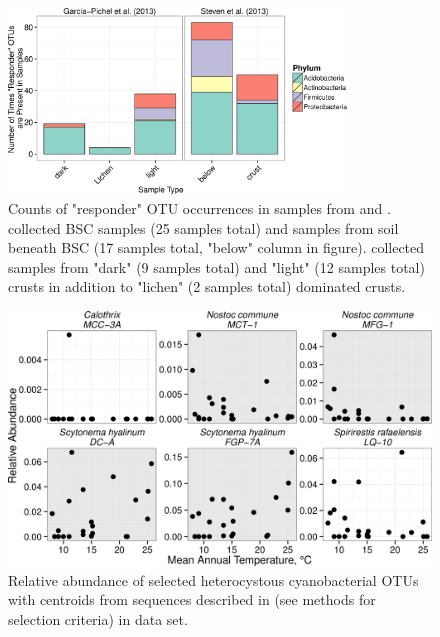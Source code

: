 \begin{figure}[h!]
  \centering
    \includegraphics[width=0.8\textwidth]{figures/rspndr_dist/rspndr_dist.png}
  \caption{Counts of "responder" OTU occurrences in samples from \citet{Steven_2013} and \citet{Garcia_Pichel_2013}. \citet{Steven_2013} collected BSC samples (25 samples total) and samples from soil beneath BSC (17 samples total, "below" column in figure). \citet{Garcia_Pichel_2013} collected samples from "dark" (9 samples total) and "light" (12 samples total) crusts in addition to "lichen" (2 samples total) dominated crusts.}
  \label{fig:rspndr_dist}
\end{figure}

\begin{figure}[h!]
  \centering
    \includegraphics[width=1.0\textwidth]{figures/het_cyano_temp/het_cyano_temp.png}
  \caption{Relative abundance of selected heterocystous cyanobacterial OTUs with centroids from sequences described in \citet{Yeager} (see methods for selection criteria) in \citet{Steven_2013} data set.}
  \label{fig:het_temp}
\end{figure}

